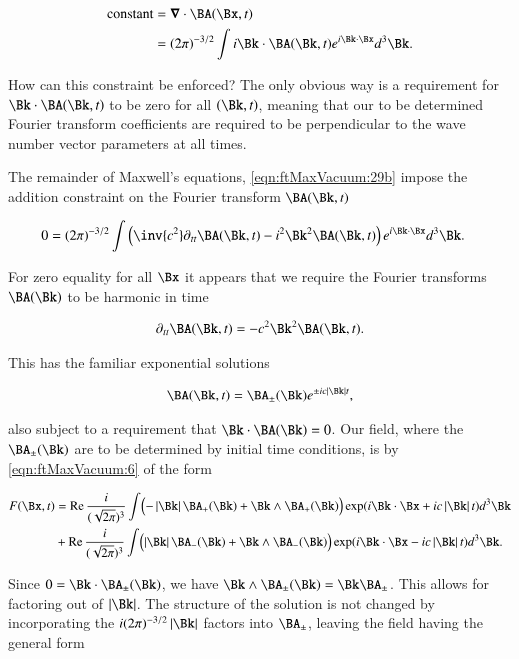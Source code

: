 \begin{align*}
\text{constant} 
&= \spacegrad \cdot \BA(\Bx, t) \\
&= (2 \pi)^{-3/2} \int i \Bk \cdot \BA(\Bk, t) e^{i \Bk \cdot \Bx } d^3 \Bk.
\end{align*}

How can this constraint be enforced?  The only obvious way is a requirement for $\Bk \cdot \BA(\Bk, t)$ to be zero for all $(\Bk,t)$, meaning that our to be determined Fourier transform coefficients are required to be perpendicular to the wave number vector parameters at all times.

The remainder of Maxwell's equations, \autoref{eqn:ftMaxVacuum:29b} impose the addition constraint on the Fourier transform $\BA(\Bk,t)$

\begin{align}\label{eqn:ftMaxVacuum:60}
0 &= (2 \pi)^{-3/2} \int \left( \inv{c^2} \partial_{tt} \BA(\Bk, t) - i^2 \Bk^2 \BA(\Bk, t)\right) e^{i \Bk \cdot \Bx } d^3 \Bk.
\end{align}

For zero equality for all $\Bx$ it appears that we require the Fourier transforms $\BA(\Bk)$ to be harmonic in time

\begin{align}\label{eqn:ftMaxVacuum:61}
\partial_{tt} \BA(\Bk, t) = - c^2 \Bk^2 \BA(\Bk, t).
\end{align}

This has the familiar exponential solutions

\begin{align}\label{eqn:ftMaxVacuum:62}
\BA(\Bk, t) = \BA_{\pm}(\Bk) e^{ \pm i c \Abs{\Bk} t },
\end{align}

also subject to a requirement that $\Bk \cdot \BA(\Bk) = 0$.  Our field, where the $\BA_{\pm}(\Bk)$ are to be determined by initial time conditions, is by \autoref{eqn:ftMaxVacuum:6} of the form

\begin{align*}%
F(\Bx, t)
&= 
\Real \frac{i}{(\sqrt{2\pi})^3} \int \Bigl( -\Abs{\Bk} \BA_{+}(\Bk) + \Bk \wedge \BA_{+}(\Bk) \Bigr) \exp(i \Bk \cdot \Bx + i c \Abs{\Bk} t) d^3 \Bk \\
&+ \Real \frac{i}{(\sqrt{2\pi})^3} \int \Bigl( \Abs{\Bk} \BA_{-}(\Bk) + \Bk \wedge \BA_{-}(\Bk) \Bigr) \exp(i \Bk \cdot \Bx - i c \Abs{\Bk} t) d^3 \Bk.
\end{align*}

Since $0 = \Bk \cdot \BA_{\pm}(\Bk)$, we have $\Bk \wedge \BA_{\pm}(\Bk) = \Bk \BA_{\pm}$.  This allows for factoring out of $\Abs{\Bk}$.  The structure of the solution is not changed by incorporating the $i (2\pi)^{-3/2} \Abs{\Bk}$ factors into $\BA_{\pm}$, leaving the field having the general form

